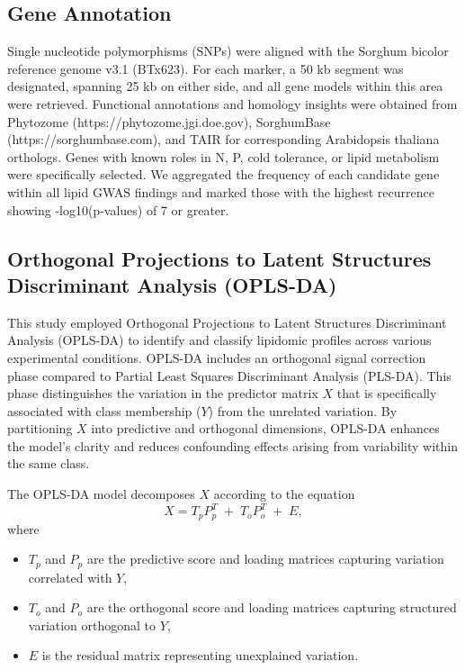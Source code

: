 \documentclass[10pt,letterpaper]{article}
\begin{document}
\subsection*{Gene Annotation}  
Single nucleotide polymorphisms (SNPs) were aligned with the Sorghum bicolor reference genome v3.1 (BTx623). For each marker, a 50 kb segment was designated, spanning 25 kb on either side, and all gene models within this area were retrieved. Functional annotations and homology insights were obtained from Phytozome (https://phytozome.jgi.doe.gov), SorghumBase (https://sorghumbase.com), and TAIR for corresponding Arabidopsis thaliana orthologs. Genes with known roles in N, P, cold tolerance, or lipid metabolism were specifically selected. We aggregated the frequency of each candidate gene within all lipid GWAS findings and marked those with the highest recurrence showing -log10(p-values) of 7 or greater.

\subsection*{Orthogonal Projections to Latent Structures Discriminant Analysis (OPLS-DA)}

This study employed Orthogonal Projections to Latent Structures Discriminant Analysis (OPLS-DA) to identify and classify lipidomic profiles across various experimental conditions. OPLS-DA includes an orthogonal signal correction phase compared to Partial Least Squares Discriminant Analysis (PLS-DA). This phase distinguishes the variation in the predictor matrix \(X\) that is specifically associated with class membership (\(Y\)) from the unrelated variation. By partitioning \(X\) into predictive and orthogonal dimensions, OPLS-DA enhances the model's clarity and reduces confounding effects arising from variability within the same class.

The OPLS-DA model decomposes \(X\) according to the equation
\[
  X = T_{p} P_{p}^{T} \;+\; T_{o} P_{o}^{T} \;+\; E,
\]
where
\begin{itemize}
  \item \(T_{p}\) and \(P_{p}\) are the predictive score and loading matrices capturing variation correlated with \(Y\),
  \item \(T_{o}\) and \(P_{o}\) are the orthogonal score and loading matrices capturing structured variation orthogonal to \(Y\),
  \item \(E\) is the residual matrix representing unexplained variation.
\end{itemize}
\end{document}
